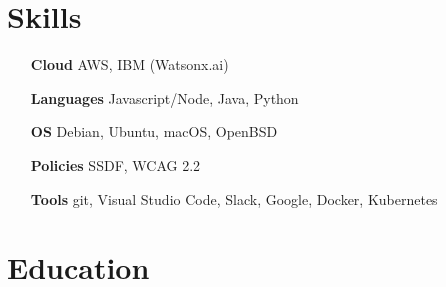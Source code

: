 \documentclass[letterpaper,10pt]{article}
\begin{document}

    \section{Skills}

    \begin{multicols}{2}
        \begin{itemize}[itemsep=-2px, parsep=1pt, leftmargin=75pt]
        \item[\textbf{Cloud}] AWS, IBM (Watsonx.ai)
        \item[\textbf{Languages}] Javascript/Node, Java, Python
        \item[\textbf{OS}] Debian, Ubuntu, macOS, OpenBSD
        \item[\textbf{Policies}] SSDF, WCAG 2.2
        \item[\textbf{Tools}] git, Visual Studio Code, Slack, Google, Docker, Kubernetes 
        \end{itemize}
    \end{multicols}
  

  \section{Education}



\end{document}
